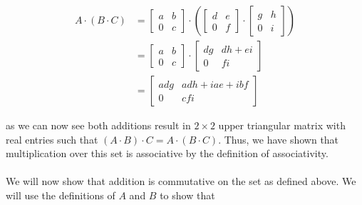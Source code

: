 \documentclass{article}
\begin{document}
      \begin{equation*}
        \begin{split}
          A \cdot (B \cdot C) &= 
            \begin{bmatrix}
              a & b\\
              0 & c
            \end{bmatrix} \cdot \left( 
            \begin{bmatrix}
              d & e\\
              0 & f
            \end{bmatrix}
           \cdot
          \begin{bmatrix} 
            g & h\\
            0 & i
          \end{bmatrix}
          \right)\\
          &=
            \begin{bmatrix}
              a & b\\
              0 & c
            \end{bmatrix}
            \cdot
            \begin{bmatrix}
              dg & dh+ei\\
              0 & fi
            \end{bmatrix}\\
          &=
            \begin{bmatrix}
              adg & adh+iae+ibf\\
              0 & cfi
            \end{bmatrix}
        \end{split}
      \end{equation*}
      
      as we can now see both additions result in $2\times2$ upper triangular matrix with real entries such that $(A \cdot B) \cdot C = A \cdot (B \cdot C)$. Thus, we have shown that multiplication over this set is associative by the definition of associativity. 

    \paragraph{
    }
    We will now show that addition is commutative on the set as defined above. We will use the definitions of $A$ and $B$ to show that
\end{document}
